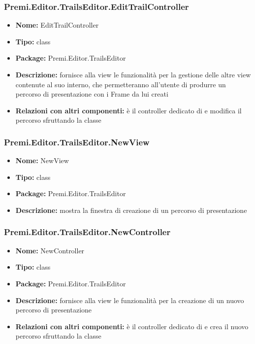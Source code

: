 \subsubsection{Premi.Editor.TrailsEditor.EditTrailController}
\begin{itemize}
  \item \textbf{Nome:} EditTrailController
  \item \textbf{Tipo:} class
  \item \textbf{Package:} Premi.Editor.TrailsEditor
  \item \textbf{Descrizione:} fornisce alla view le funzionalità per la gestione delle altre view contenute al suo interno, che permetteranno all'utente di produrre un percorso di presentazione con i Frame da lui creati
  \item \textbf{Relazioni con altri componenti:} è il controller dedicato di   e modifica il percorso sfruttando la classe 
\end{itemize}
\subsubsection{Premi.Editor.TrailsEditor.NewView}
\begin{itemize}
  \item \textbf{Nome:} NewView
  \item \textbf{Tipo:} class
  \item \textbf{Package:} Premi.Editor.TrailsEditor
  \item \textbf{Descrizione:} mostra la finestra di creazione di un percorso di presentazione
\end{itemize}
\subsubsection{Premi.Editor.TrailsEditor.NewController}
\begin{itemize}
  \item \textbf{Nome:} NewController
  \item \textbf{Tipo:} class
  \item \textbf{Package:} Premi.Editor.TrailsEditor
  \item \textbf{Descrizione:} fornisce alla view le funzionalità per la creazione di un nuovo percorso di presentazione
  \item \textbf{Relazioni con altri componenti:} è il controller dedicato di   e crea il nuovo percorso sfruttando la classe 
\end{itemize}
